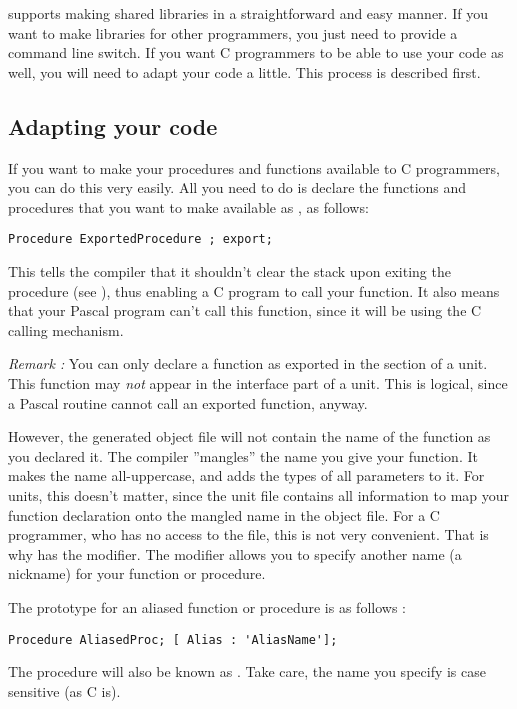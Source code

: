 \documentclass{report}
\begin{document}
\fpc supports making shared libraries in a straightforward and easy manner.
If you want to make libraries for other \fpc programmers, you just need to
provide a command line switch. If you want C programmers to be able to use
your code as well, you will need to adapt your code a little. This process
is described first.

\subsection{Adapting your code}

If you want to make your procedures and functions available to C
programmers, you can do this very easily. All you need to do is declare the
functions and procedures that you want to make available as , as
follows:
\begin{verbatim}
Procedure ExportedProcedure ; export;
\end{verbatim}
This tells the compiler that it shouldn't clear the stack upon exiting the
procedure (see ), thus enabling a C program to call your
function. It also means that your Pascal program can't call this function,
since it will be using the C calling mechanism.

{\em Remark :} You can only declare a function as exported in the
 section of a unit. This function may {\em not} appear
in the interface part of a unit. This is logical, since a Pascal routine
cannot call an exported function, anyway.

However, the generated object file will not contain the name of the function
as you declared it. The \fpc compiler ''mangles'' the name you give your
function. It makes the name all-uppercase, and adds the types of all
parameters to it. For \fpc units, this doesn't matter, since the 
unit file contains all information to map your function declaration onto the
mangled name in the object file. For a C programmer, who has no access to
the  file, this is not very convenient. That is why \fpc
has the  modifier. The  modifier allows you to specify
another name (a nickname) for your function or procedure.

The prototype for an aliased function or procedure is as follows :
\begin{verbatim}
Procedure AliasedProc; [ Alias : 'AliasName'];
\end{verbatim}
The procedure  will also be known as . Take
care, the name you specify is case sensitive (as C is).
\end{document}
